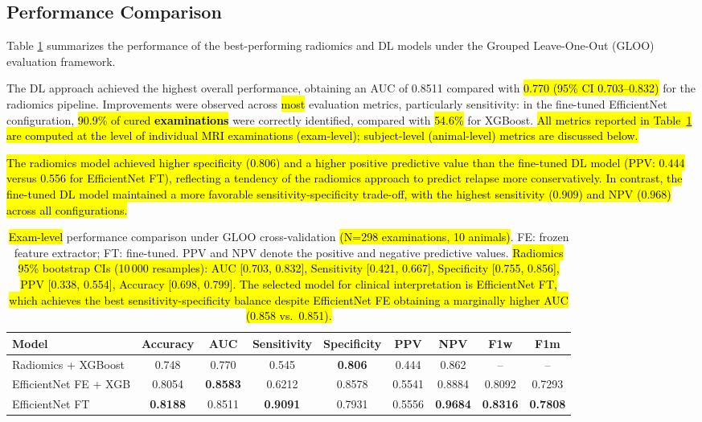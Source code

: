 \documentclass{article}
\begin{document}
\subsection{Performance Comparison}

Table \ref{tab:all_models} summarizes the performance of the best-performing radiomics and DL models under the Grouped Leave-One-Out (GLOO) evaluation framework.

The DL approach achieved the highest overall performance, obtaining an AUC of 0.8511 compared with \hl{0.770 (95\% CI 0.703--0.832)} for the radiomics pipeline. Improvements were observed across \hl{most} evaluation metrics, particularly sensitivity: in the fine-tuned EfficientNet configuration, \hl{90.9\% of cured \textbf{examinations}} were correctly identified, compared with \hl{54.6\%} for XGBoost. \hl{All metrics reported in Table~\ref{tab:all_models} are computed at the level of individual MRI examinations (exam-level); subject-level (animal-level) metrics are discussed below.}

\hl{The radiomics model achieved higher specificity (0.806) and a higher positive predictive value than the fine-tuned DL model (PPV: 0.444 versus 0.556 for EfficientNet FT), reflecting a tendency of the radiomics approach to predict relapse more conservatively. In contrast, the fine-tuned DL model maintained a more favorable sensitivity-specificity trade-off, with the highest sensitivity (0.909) and NPV (0.968) across all configurations.}

\begin{table}[ht]
\centering
\begin{tabular}{lcccccccc}
\hline
Model &
Accuracy &
AUC &
Sensitivity &
Specificity &
PPV &
NPV &
F1w &
F1m \\
\hline

\rowcolor{yellow!40}
Radiomics + XGBoost &
0.748 &
0.770 &
0.545 &
\textbf{0.806} &
0.444 &
0.862 &
-- &
-- \\

EfficientNet FE + XGB &
0.8054 &
\textbf{0.8583} &
0.6212 &
0.8578 &
0.5541 &
0.8884 &
0.8092 &
0.7293 \\

EfficientNet FT &
\textbf{0.8188} &
0.8511 &
\textbf{0.9091} &
0.7931 &
0.5556 &
\textbf{0.9684} &
\textbf{0.8316} &
\textbf{0.7808}
\\

\hline
\end{tabular}
\caption{\hl{Exam-level} performance comparison under GLOO cross-validation \hl{(N=298 examinations, 10 animals)}. FE: frozen feature extractor; FT: fine-tuned. PPV and NPV denote the positive and negative predictive values. \hl{Radiomics 95\% bootstrap CIs (10\,000 resamples): AUC [0.703, 0.832], Sensitivity [0.421, 0.667], Specificity [0.755, 0.856], PPV [0.338, 0.554], Accuracy [0.698, 0.799]. The selected model for clinical interpretation is EfficientNet FT, which achieves the best sensitivity-specificity balance despite EfficientNet FE obtaining a marginally higher AUC (0.858 vs.\ 0.851).}}
\label{tab:all_models}
\end{table}
\end{document}
